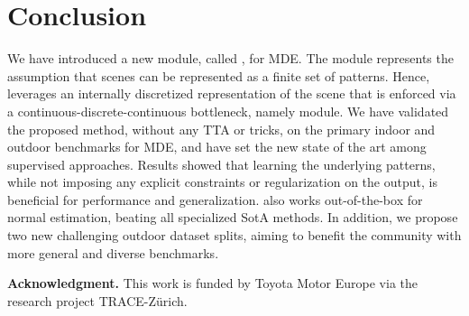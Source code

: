 \section{Conclusion}
We have introduced a new module, called \ourmodulename, for MDE. The module represents the assumption that scenes can be represented as a finite set of patterns. Hence, \ourmodel leverages an internally discretized representation of the scene that is enforced via a continuous-discrete-continuous bottleneck, namely \ourmodule module. We have validated the proposed method, without any TTA or tricks, on the primary indoor and outdoor benchmarks for MDE, and have set the new state of the art among supervised approaches. Results showed that learning the underlying patterns, while not imposing any explicit constraints or regularization on the output, is beneficial for performance and generalization. \ourmodel also works out-of-the-box for normal estimation, beating all specialized SotA methods. In addition, we propose two new challenging outdoor dataset splits, aiming to benefit the community with more general and diverse benchmarks.

\vfill
\noindent{}\textbf{Acknowledgment.} This work is funded by Toyota Motor Europe via the research project TRACE-Z\"urich.